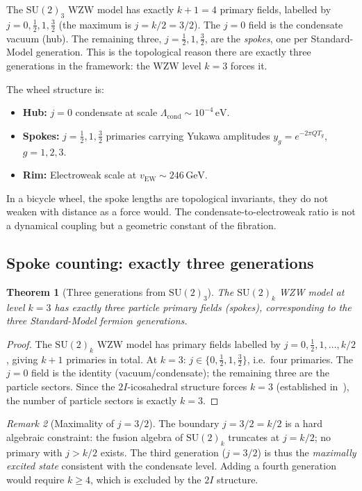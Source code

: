\documentclass[11pt,a4paper]{article}
\newtheorem{theorem}{Theorem}[section]
\theoremstyle{definition}
\theoremstyle{remark}
\newtheorem{remark}[theorem]{Remark}
\newcommand{\vEW}{v_{\mathrm{EW}}}
\newcommand{\Lcond}{\Lambda_{\mathrm{cond}}}
\begin{document}
The $\mathrm{SU}(2)_3$ WZW model has exactly $k+1 = 4$ primary fields,
labelled by $j = 0,\tfrac{1}{2},1,\tfrac{3}{2}$ (the maximum is $j=k/2=3/2$).
The $j=0$ field is the condensate vacuum (hub).  The remaining three,
$j=\tfrac{1}{2},1,\tfrac{3}{2}$, are the \emph{spokes}, one per
Standard-Model generation.  This is the topological reason there are
exactly three generations in the framework: the WZW level $k=3$ forces it.

The wheel structure is:
\begin{itemize}[noitemsep]
\item \textbf{Hub:} $j=0$ condensate at scale $\Lcond \sim 10^{-4}\,\mathrm{eV}$.
\item \textbf{Spokes:} $j=\tfrac{1}{2},1,\tfrac{3}{2}$ primaries carrying
  Yukawa amplitudes $y_g = e^{-2\pi Q T_g}$, $g=1,2,3$.
\item \textbf{Rim:} Electroweak scale at $\vEW \sim 246\,\mathrm{GeV}$.
\end{itemize}
In a bicycle wheel, the spoke lengths are topological invariants,
they do not weaken with distance as a force would.  The
condensate-to-electroweak ratio is not a dynamical coupling but a
geometric constant of the fibration.

\subsection{Spoke counting: exactly three generations}
\label{P4:sec:spoke_counting}

\begin{theorem}[Three generations from $\mathrm{SU}(2)_3$]
\label{P4:thm:three_gen}
The $\mathrm{SU}(2)_k$ WZW model at level $k=3$ has exactly three
particle primary fields (spokes), corresponding to the three
Standard-Model fermion generations.
\end{theorem}

\begin{proof}
The $\mathrm{SU}(2)_k$ WZW model has primary fields labelled by
$j = 0,\tfrac{1}{2},1,\ldots,k/2$, giving $k+1$ primaries in total.
At $k=3$: $j\in\{0,\tfrac{1}{2},1,\tfrac{3}{2}\}$, i.e.\ four primaries.
The $j=0$ field is the identity (vacuum/condensate); the remaining three are
the particle sectors.  Since the $2I$-icosahedral structure forces $k=3$
(established in~\cite{Paper1}), the number of particle sectors is exactly $k=3$.
\end{proof}

\begin{remark}[Maximality of $j=3/2$]
\label{P4:rem:j32_maximality}
The boundary $j=3/2=k/2$ is a hard algebraic constraint: the fusion algebra
of $\mathrm{SU}(2)_k$ truncates at $j=k/2$; no primary with $j>k/2$ exists.
The third generation ($j=3/2$) is thus the \emph{maximally excited state}
consistent with the condensate level.  Adding a fourth generation would
require $k\geq 4$, which is excluded by the $2I$ structure.
\end{remark}
\end{document}
